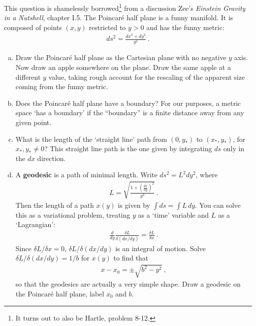\documentclass[12pt]{article}
\numberwithin{equation}{section}    %
\begin{document}
This question is shamelessly borrowed\footnote{It turns out to also be Hartle, problem 8-12.} from a discussion Zee's \emph{Einstein Gravity in a Nutshell}, chapter I.5. The Poincar\'e half plane is a funny manifold. It is composed of points $(x,y)$ restricted to $y>0$ and has the funny metric:
\begin{align}
	ds^2 = \frac{dx^2 + dy^2}{y^2}\ .
\end{align}
\begin{enumerate}[(a)]
	\item Draw the Poincar\'e half plane as the Cartesian plane with no negative $y$ axis. Now draw an apple somewhere on the plane. Draw the same apple at a different $y$ value, taking rough account for the rescaling of the apparent size coming from the funny metric.
	\item Does the Poincar\'e half plane have a boundary? For our purposes, a metric space `has a boundary' if the ``boundary'' is a finite distance away from any given point.
	\item What is the length of the `straight line' path from $(0,y_*)$ to $(x_*,y_*)$, for $x_*, y_* \neq 0$? This straight line path is the one given by integrating $ds$ only in the $dx$ direction.
	\item A \textbf{geodesic} is a path of minimal length. Write $ds^2 = L^2 dy^2$, where
	\begin{align}
		L = \sqrt{\frac{1+\left(\frac{dx}{dy}\right)^2}{y^2}} \ .
	\end{align}
	Then the length of a path $x(y)$ is given by $\int ds = \int L\, dy$. You can solve this as a variational problem, treating $y$ as a `time' variable and $L$ as a `Lagrangian':
	\begin{align}
		\frac{d}{dy} \frac{\delta L}{\delta (dx/dy)}
		= \frac{\delta L}{\delta x} \ .
	\end{align}
	Since $\delta L / \delta x = 0$, $\delta L/\delta (dx/dy)$ is an integral of motion. Solve $\delta L/\delta (dx/dy) = 1/b$ for $x(y)$ to find that
	\begin{align}
		x - x_0 = \pm \sqrt{b^2 - y^2} \ ,
	\end{align}
	so that the geodesics are actually a very simple shape.
	Draw a geodesic on the Poincar\'e half plane, label $x_0$ and $b$. 
\end{enumerate}
\end{document}
